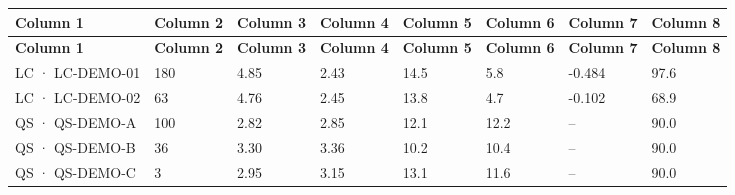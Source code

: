 {\footnotesize
\begin{longtable}{@{}llllllll@{}}
\toprule \textbf{Column 1} & \textbf{Column 2} & \textbf{Column 3} & \textbf{Column 4} & \textbf{Column 5} & \textbf{Column 6} & \textbf{Column 7} & \textbf{Column 8} \\\midrule\endfirsthead
\toprule \textbf{Column 1} & \textbf{Column 2} & \textbf{Column 3} & \textbf{Column 4} & \textbf{Column 5} & \textbf{Column 6} & \textbf{Column 7} & \textbf{Column 8} \\\midrule\endhead
LC · LC-DEMO-01 & 180 & 4.85 & 2.43 & 14.5 & 5.8 & -0.484 & 97.6 \\\hline
LC · LC-DEMO-02 & 63 & 4.76 & 2.45 & 13.8 & 4.7 & -0.102 & 68.9 \\\hline
QS · QS-DEMO-A & 100 & 2.82 & 2.85 & 12.1 & 12.2 & – & 90.0 \\\hline
QS · QS-DEMO-B & 36 & 3.30 & 3.36 & 10.2 & 10.4 & – & 90.0 \\\hline
QS · QS-DEMO-C & 3 & 2.95 & 3.15 & 13.1 & 11.6 & – & 90.0 \\\hline
\bottomrule
\end{longtable}}

